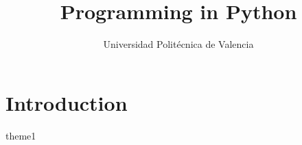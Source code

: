 \documentclass[fontsize=10pt,a4paper]{book}
\title{Programming in Python}
\subtitle{}
\author{Universidad Politécnica de Valencia}
\date{\academicyear{}}
\begin{document}
\maketitle



\tableofcontents

\newpage

\chapter{Introduction}
{theme1}

\chapter{}
{}
\end{document}
